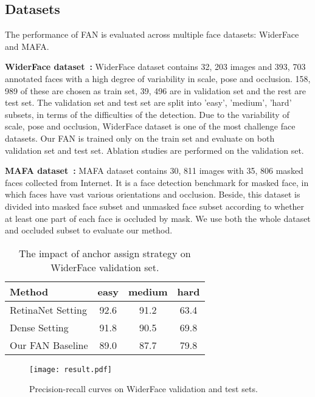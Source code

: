 \documentclass[10pt,twocolumn,letterpaper]{article}
\begin{document}
\subsection{Datasets}
The performance of FAN is evaluated across multiple face datasets: WiderFace and MAFA.

\textbf{WiderFace dataset~\cite{yang2016wider}:} WiderFace dataset contains 32, 203 images and 393, 703 annotated faces with a high degree of variability in scale, pose and occlusion. 158, 989 of these are chosen as train set, 39, 496 are in validation set and the rest are test set. The validation set and test set are split into 'easy', 'medium', 'hard' subsets, in terms of the difficulties of the detection. Due to the variability of scale, pose and occlusion, WiderFace dataset is one of the most challenge face datasets. Our FAN is trained only on the train set and evaluate on both validation set and test set. Ablation studies are performed on the validation set.

\textbf{MAFA dataset~\cite{Ge_2017_CVPR}:} MAFA dataset contains 30, 811 images with 35, 806 masked faces collected from Internet. It is a face detection benchmark for masked face, in which faces have vast various orientations and occlusion. Beside, this dataset is divided into masked face subset and unmasked face subset according to whether at least one part of each face is occluded by mask. We use both the whole dataset and occluded subset to evaluate our method.











\begin{table}[h]
\begin{center}
\begin{tabular}{|l|c|c|c|}
\hline
Method & easy & medium & hard \\
\hline
RetinaNet Setting & 92.6 & 91.2 & 63.4 \\
Dense Setting & 91.8 & 90.5 & 69.8 \\
Our FAN Baseline & 89.0 & 87.7 & 79.8 \\
\hline
\end{tabular}
\end{center}
\caption{The impact of anchor assign strategy on WiderFace validation set.}
\label{table: anchor setting}
\end{table}

\begin{figure*}[t]
\begin{center}
    \texttt{[image: result.pdf]}
\end{center}
    \caption{Precision-recall curves on WiderFace validation and test sets.} 
\label{fig:pr_curve}
\end{figure*}
\end{document}
